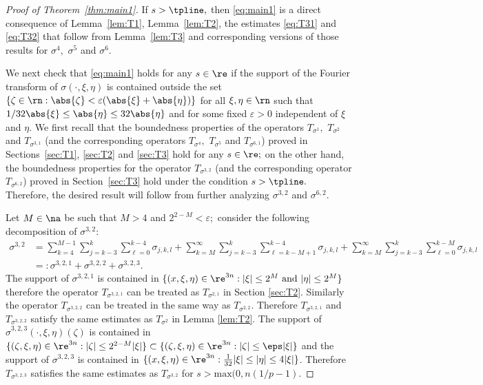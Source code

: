 \begin{proof}[Proof of Theorem~\ref{thm:main1}] If $s>\tpline,$ then \eqref{eq:main1}  is a direct consequence of  Lemma~\ref{lem:T1}, Lemma~\ref{lem:T2}, the estimates \eqref{eq:T31} and \eqref{eq:T32} that follow from Lemma~\ref{lem:T3} and corresponding versions  of those results for $\sigma^4,$  $\sigma^5$ and $\sigma^6.$

We next check that \eqref{eq:main1} holds for any $s\in \re$ if the support of the Fourier transform of $\sigma(\cdot,\xi,\eta)$ is contained outside the set 
$\{\zeta\in\rn:\abs{\zeta}<\varepsilon (\abs{\xi}+\abs{\eta})\}$ for all  $\xi,\eta\in\rn$ such that $1/32\abs{\xi}\le \abs{\eta}\le 32 \abs{\eta}$ and for some fixed $\varepsilon>0$ independent of $\xi$ and $\eta.$ We first recall that the boundedness properties of the operators $T_{\sigma^1},$ $T_{\sigma^2}$ and $T_{\sigma^{3,1}}$ (and the corresponding operators $T_{\sigma^4},$ $T_{\sigma^5}$ and $T_{\sigma^{6,1}}$) proved in Sections~\ref{sec:T1}, \ref{sec:T2} and \ref{sec:T3} hold for any $s\in \re;$ on the other hand,  the boundedness properties for the operator $T_{\sigma^{3,2}}$ (and the corresponding operator $T_{\sigma^{6,2}}$) proved in Section~\ref{sec:T3} hold under the condition $s>\tpline.$   Therefore, the desired result will follow from further analyzing $\sigma^{3,2}$ and $\sigma^{6,2}.$ 

Let $M\in\na$ be such that $M>4$ and $2^{2-M}<\varepsilon;$ consider the following decomposition of $\sigma^{3,2}:$
\begin{align*}
\sigma^{3,2}&=\sum_{k=4}^{M-1}\sum_{j=k-3}^k\sum_{\ell=0}^{k-4}\sigma_{j,k,l}+\sum_{k=M}^{\infty}\sum_{j=k-3}^k\sum_{\ell=k-M+1}^{k-4}\sigma_{j,k,l}+\sum_{k=M}^{\infty}\sum_{j=k-3}^k\sum_{\ell=0}^{k-M}\sigma_{j,k,l}\\&=:\sigma^{3,2,1} +\sigma^{3,2,2}+\sigma^{3,2,3}.
\end{align*}
The support of $\sigma^{3,2,1}$ is contained in $\{(x,\xi,\eta)\in \re^{3n}: |\xi| \leq 2^M \text{ and } |\eta|\leq 2^M \}$ therefore the operator $T_{\sigma^{3,2,1}}$ can be treated as $T_{\sigma^{2,1}}$ in Section \ref{sec:T2}. Similarly the operator $T_{\sigma^{3,2,2}}$ can be treated in the same way as $T_{\sigma^{2,2}}$. Therefore $T_{\sigma^{3,2,1}}$ and $T_{\sigma^{3,2,2}}$ satisfy the same estimates as $T_{\sigma^2}$ in Lemma \ref{lem:T2}. The support of $\widehat{\sigma}^{3,2,3}(\cdot,\xi,\eta)(\zeta)$ is contained in $\{(\zeta,\xi,\eta)\in\re^{3n}: |\zeta| \leq 2^{2-M} |\xi| \} \subset \{(\zeta,\xi,\eta)\in\re^{3n}: |\zeta| \leq \eps |\xi| \}$ and the support of $\sigma^{3,2,3}$ is contained in $\{(x,\xi,\eta)\in\re^{3n}: \frac{1}{32}|\xi| \leq |\eta| \leq 4|\xi| \}$. Therefore $T_{\sigma^{3,2,3}}$ satisfies the same estimates as $T_{\sigma^{3,2}}$ for $s>\text{max}(0,n(1/p - 1)$.


\end{proof}
